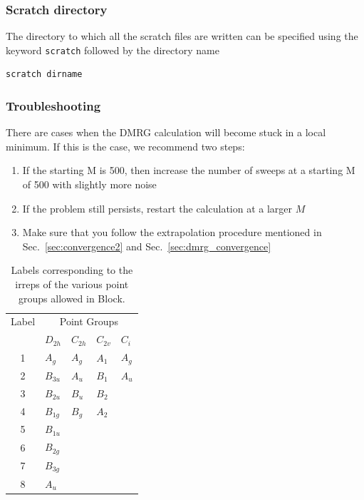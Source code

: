 \documentclass[letterpaper,12pt,aps, pra]{revtex4-1}
\begin{document}
\subsubsection{Scratch directory}
The directory to which all the scratch files are written can be specified using
the keyword \texttt{scratch}  followed by the directory name
\begin{verbatim}
scratch dirname
\end{verbatim}

\subsubsection{Troubleshooting}
There are cases when the DMRG calculation will become stuck in a local minimum.
If this is the case, we recommend two steps:
\begin{enumerate}
	\item If the starting M is 500, then increase the number of sweeps at a starting M of 500 with slightly more noise
	\item If the problem still persists, restart the calculation at a larger $M$
	\item Make sure that you follow the extrapolation procedure mentioned in
		Sec.~\ref{sec:convergence2} and Sec.~\ref{sec:dmrg_convergence}
\end{enumerate}

\begin{table}
	\label{tab:irrep} 
	\begin{center} 
		\caption{Labels corresponding to the irreps of the various
		point groups allowed in Block.}
	\begin{tabular}{cllll} 
		\hline \hline 
		Label & \multicolumn{4}{c}{Point Groups}\\ 
		      &$D_{2h}$&$C_{2h}$&$C_{2v}$&$C_i$\\ 
		\hline
	1&$A_g$&$A_g$&$A_1$&$A_g$\\ 
	2&$B_{3u}$&$A_u$&$B_1$&$A_u$\\
	3&$B_{2u}$&$B_u$&$B_2$&\\ 
	4&$B_{1g}$&$B_g$&$A_2$&\\ 
	5&$B_{1u}$&&&\\
	6&$B_{2g}$&&&\\ 
	7&$B_{3g}$&&&\\ 
	8&$A_u$&&&\\ 
	\hline \hline
\end{tabular} 
\end{center} 
\end{table} 
\end{document}
